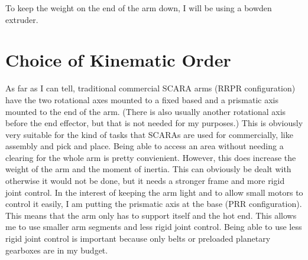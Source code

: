 \documentclass[12pt]{report}
\begin{document}
To keep the weight on the end of the arm down, I will be using a bowden extruder. 

\section{Choice of Kinematic Order}
As far as I can tell, traditional commercial SCARA arms (RRPR configuration) have the two rotational axes mounted to a fixed based and a prismatic axis mounted to the end of the arm. (There is also usually another rotational axis before the end effector, but that is not needed for my purposes.) This is obviously very suitable for the kind of tasks that SCARAs are used for commercially, like assembly and pick and place. Being able to access an area without needing a clearing for the whole arm is pretty convienient. However, this does increase the weight of the arm and the moment of inertia. This can obviously be dealt with otherwise it would not be done, but it needs a stronger frame and more rigid joint control. In the interest of keeping the arm light and to allow small motors to control it easily, I am putting the prismatic axis at the base (PRR configuration). This means that the arm only has to support itself and the hot end. This allows me to use smaller arm segments and less rigid joint control. Being able to use less rigid joint control is important because only belts or preloaded planetary gearboxes are in my budget.
\end{document}
